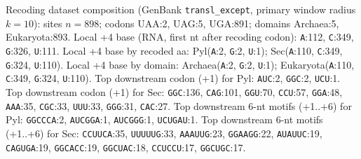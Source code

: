 Recoding dataset composition (GenBank \texttt{transl\_except}, primary window radius $k=10$): sites $n=898$; codons UAA:2, UAG:5, UGA:891; domains Archaea:5, Eukaryota:893.
Local +4 base (RNA, first nt after recoding codon): \texttt{A}:112, \texttt{C}:349, \texttt{G}:326, \texttt{U}:111.
Local +4 base by recoded aa: Pyl(\texttt{A}:2, \texttt{G}:2, \texttt{U}:1); Sec(\texttt{A}:110, \texttt{C}:349, \texttt{G}:324, \texttt{U}:110).
Local +4 base by domain: Archaea(\texttt{A}:2, \texttt{G}:2, \texttt{U}:1); Eukaryota(\texttt{A}:110, \texttt{C}:349, \texttt{G}:324, \texttt{U}:110).
Top downstream codon (+1) for Pyl: \texttt{AUC}:2, \texttt{GGC}:2, \texttt{UCU}:1.
Top downstream codon (+1) for Sec: \texttt{GGC}:136, \texttt{CAG}:101, \texttt{GGU}:70, \texttt{CCU}:57, \texttt{GGA}:48, \texttt{AAA}:35, \texttt{CGC}:33, \texttt{UUU}:33, \texttt{GGG}:31, \texttt{CAC}:27.
Top downstream 6-nt motifs (+1..+6) for Pyl: \texttt{GGCCCA}:2, \texttt{AUCGGA}:1, \texttt{AUCGGG}:1, \texttt{UCUGAU}:1.
Top downstream 6-nt motifs (+1..+6) for Sec: \texttt{CCUUCA}:35, \texttt{UUUUUG}:33, \texttt{AAAUUG}:23, \texttt{GGAAGG}:22, \texttt{AUAUUC}:19, \texttt{CAGUGA}:19, \texttt{GGCACC}:19, \texttt{GGCUAC}:18, \texttt{CCUCCU}:17, \texttt{GGCUGC}:17.

